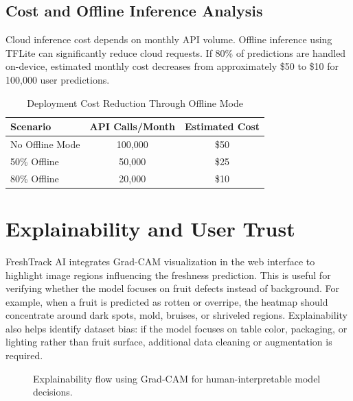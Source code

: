 \documentclass[conference]{IEEEtran}
\begin{document}
\subsection{Cost and Offline Inference Analysis}
Cloud inference cost depends on monthly API volume. Offline inference using TFLite can significantly reduce cloud requests. If 80\% of predictions are handled on-device, estimated monthly cost decreases from approximately \$50 to \$10 for 100,000 user predictions.

\begin{table}[h]
\centering
\caption{Deployment Cost Reduction Through Offline Mode}
\label{tab:cost}
\begin{tabular}{lcc}
\toprule
\textbf{Scenario} & \textbf{API Calls/Month} & \textbf{Estimated Cost} \\
\midrule
No Offline Mode & 100,000 & \$50 \\
50\% Offline & 50,000 & \$25 \\
80\% Offline & 20,000 & \$10 \\
\bottomrule
\end{tabular}
\end{table}

\section{Explainability and User Trust}
FreshTrack AI integrates Grad-CAM visualization in the web interface to highlight image regions influencing the freshness prediction. This is useful for verifying whether the model focuses on fruit defects instead of background. For example, when a fruit is predicted as rotten or overripe, the heatmap should concentrate around dark spots, mold, bruises, or shriveled regions. Explainability also helps identify dataset bias: if the model focuses on table color, packaging, or lighting rather than fruit surface, additional data cleaning or augmentation is required.

\begin{figure}[t]
\centering
{}
\caption{Explainability flow using Grad-CAM for human-interpretable model decisions.}
\label{fig:gradcam_flow}
\end{figure}
\end{document}
